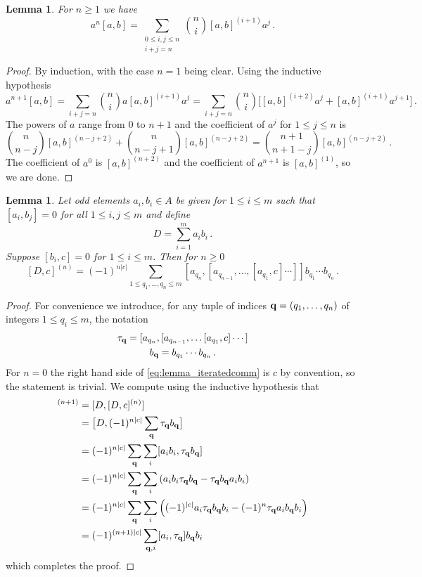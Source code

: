 \documentclass[english,letter paper,12pt,leqno]{article}
\newtheorem{lemma}[theorem]{Lemma}
\theoremstyle{example}
\numberwithin{equation}{section}
\def\be{\begin{equation}}
\def\ee{\end{equation}}
\begin{document}
\begin{lemma}\label{lemma:woop4} For $n \ge 1$ we have
\be
a^n [a, b] = \sum_{\substack{0 \le i,j \le n \\ i+j=n}} \binom{n}{i} [a,b]^{(i+1)} a^j\,.
\ee
\end{lemma}
\begin{proof}
By induction, with the case $n = 1$ being clear. Using the inductive hypothesis
\[
a^{n+1} [a, b] = \sum_{i+j=n} \binom{n}{i} a [a,b]^{(i+1)} a^j = \sum_{i+j=n} \binom{n}{i} \Big[ [a,b]^{(i+2)} a^j + [a,b]^{(i+1)} a^{j+1} \Big]\,.
\]
The powers of $a$ range from $0$ to $n+1$ and the coefficient of $a^j$ for $1 \le j \le n$ is
\[
\binom{n}{n-j} [a,b]^{(n-j+2)} + \binom{n}{n-j+1} [a,b]^{(n-j+2)} = \binom{n+1}{n+1-j} [a,b]^{(n-j+2)}\,.
\]
The coefficient of $a^0$ is $[a,b]^{(n+2)}$ and the coefficient of $a^{n+1}$ is $[a,b]^{(1)}$, so we are done.
\end{proof}

\begin{lemma}\label{lemma_iteratedcomm} Let odd elements $a_i, b_i \in A$ be given for $1 \le i \le m$ such that $[a_i, b_j] = 0$ for all $1 \le i,j \le m$ and define
\[
D = \sum_{i=1}^m a_i b_i\,.
\]
Suppose $[b_i,c] = 0$ for $1 \le i \le m$. Then for $n \ge 0$
\be\label{eq:lemma_iteratedcomm}
[D, c]^{(n)} = (-1)^{n|c|} \sum_{1 \le q_1,\ldots,q_n \le m} [a_{q_n}, [a_{q_{n-1}}, \ldots, [ a_{q_1}, c] \cdots ]] b_{q_1} \cdots b_{q_n}\,.
\ee
\end{lemma}
\begin{proof}
For convenience we introduce, for any tuple of indices $\bold{q} = (q_1,\ldots,q_n)$ of integers $1 \le q_i \le m$, the notation
\begin{gather}
\tau_{\bold{q}} = [ a_{q_n}, [ a_{q_{n-1}}, \ldots [ a_{q_1}, c ] \cdots ] \label{defn:tau}\\
b_{\bold{q}} = b_{q_1} \cdots b_{q_n} \label{defn:bq}\,.
\end{gather}
For $n = 0$ the right hand side of \eqref{eq:lemma_iteratedcomm} is $c$ by convention, so the statement is trivial. We compute using the inductive hypothesis that
\begin{align*}
[D, c]^{(n+1)} &= [ D, [D, c]^{(n)} ]\\
&= \big[D, (-1)^{n|c|} \sum_{\bold{q}} \tau_{\bold{q}} b_{\bold{q}}\big]\\
&= (-1)^{n|c|} \sum_{\bold{q}} \sum_i [ a_i b_i , \tau_{\bold{q}} b_{\bold{q}}]\\
&= (-1)^{n|c|} \sum_{\bold{q}} \sum_i \left( a_i b_i \tau_{\bold{q}} b_{\bold{q}} - \tau_{\bold{q}} b_{\bold{q}} a_i b_i \right)\\
&= (-1)^{n|c|} \sum_{\bold{q}} \sum_i \left( (-1)^{|c|} a_i \tau_{\bold{q}} b_{\bold{q}} b_i - (-1)^n \tau_{\bold{q}} a_i b_{\bold{q}} b_i \right)\\
&= (-1)^{(n+1)|c|} \sum_{\bold{q}, i} [ a_i, \tau_{\bold{q}} ] b_{\bold{q}} b_i
\end{align*}
which completes the proof.
\end{proof}
\end{document}
